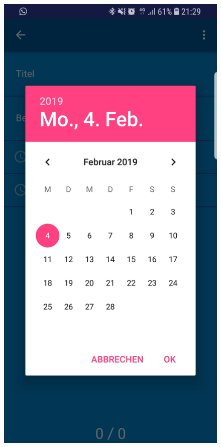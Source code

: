 \begin{figure}[H]
\begin{minipage}[t]{1\textwidth}
\includegraphics[width=1\textwidth]{img/Todo_Datepicker}\\ %
\end{minipage}
\end{figure}

